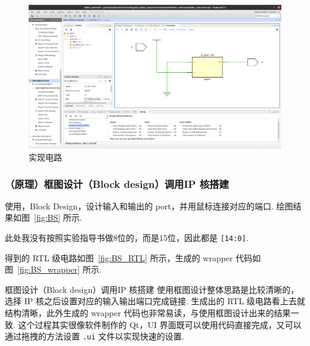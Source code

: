 \documentclass[11pt]{SEU-Digital-Report}
\begin{document}
        \clearpage
        \begin{figure}[htbp]
          \centering
          \includegraphics[width=\linewidth]{fig/IP_imp.png}
          \caption{实现电路}
          \label{fig:IP_imp}
        \end{figure}

      \subsubsection{（原理）框图设计（Block design）调用IP 核搭建}

        使用，Block Design，设计输入和输出的 port，并用鼠标连接对应的端口.
        绘图结果如图~\ref{fig:BS} 所示.
        \begin{note}{}{}
          此处我没有按照实验指导书做8位的，而是15位，因此都是 \texttt{[14:0]}.
        \end{note}

        得到的 RTL 级电路如图~\ref{fig:BS_RTL} 所示，生成的 wrapper 代码如图~\ref{fig:BS_wrapper} 所示.

        \begin{analyze}{框图设计（Block design）调用IP 核搭建}{}
          使用框图设计整体思路是比较清晰的，选择 IP 核之后设置对应的输入输出端口完成链接.
          生成出的 RTL 级电路看上去就结构清晰，此外生成的 wrapper 代码也非常易读，与使用框图设计出来的结果一致.
          这个过程其实很像软件制作的 Qt，UI 界面既可以使用代码直接完成，又可以通过拖拽的方法设置 \texttt{.ui} 文件以实现快速的设置.
        \end{analyze}
        
\end{document}
